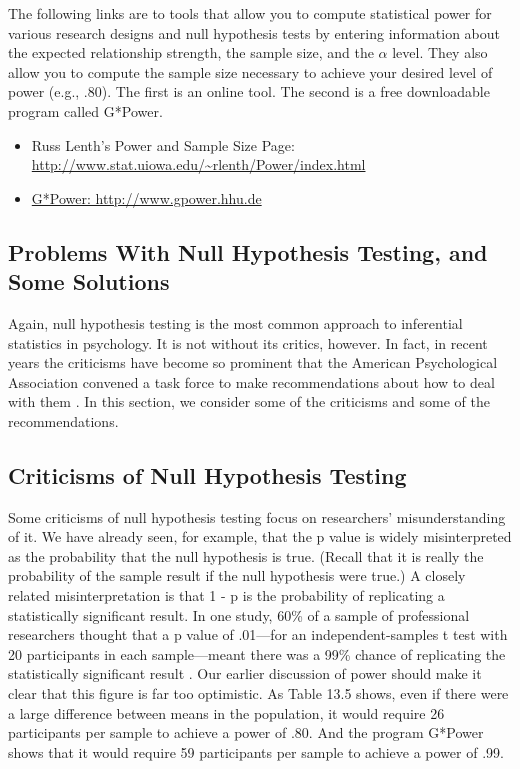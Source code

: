 The following links are to tools that allow you to compute statistical power for various research designs and null hypothesis tests by entering information about the expected relationship strength, the sample size, and the $\alpha$ level. They also allow you to compute the sample size necessary to achieve your desired level of power (e.g., .80). The first is an online tool. The second is a free downloadable program called G*Power.

\begin{itemize}
\item Russ Lenth's Power and Sample Size Page: \url{http://www.stat.uiowa.edu/~rlenth/Power/index.html}
\item \url{G*Power: http://www.gpower.hhu.de}
\end{itemize}

\subsection{Problems With Null Hypothesis Testing, and Some Solutions}


Again, null hypothesis testing is the most common approach to inferential statistics in psychology. It is not without its critics, however. In fact, in recent years the criticisms have become so prominent that the American Psychological Association convened a task force to make recommendations about how to deal with them \citep{wilkinson_statistical_1999}. In this section, we consider some of the criticisms and some of the recommendations.


\subsection{Criticisms of Null Hypothesis Testing}


Some criticisms of null hypothesis testing focus on researchers' misunderstanding of it. We have already seen, for example, that the p value is widely misinterpreted as the probability that the null hypothesis is true. (Recall that it is really the probability of the sample result if the null hypothesis were true.) A closely related misinterpretation is that 1 - p is the probability of replicating a statistically significant result. In one study, 60\% of a sample of professional researchers thought that a p value of .01---for an independent-samples t test with 20 participants in each sample---meant there was a 99\% chance of replicating the statistically significant result \citep{oaks_statistical_1986}. Our earlier discussion of power should make it clear that this figure is far too optimistic. As Table 13.5 shows, even if there were a large difference between means in the population, it would require 26 participants per sample to achieve a power of .80. And the program G*Power shows that it would require 59 participants per sample to achieve a power of .99.


